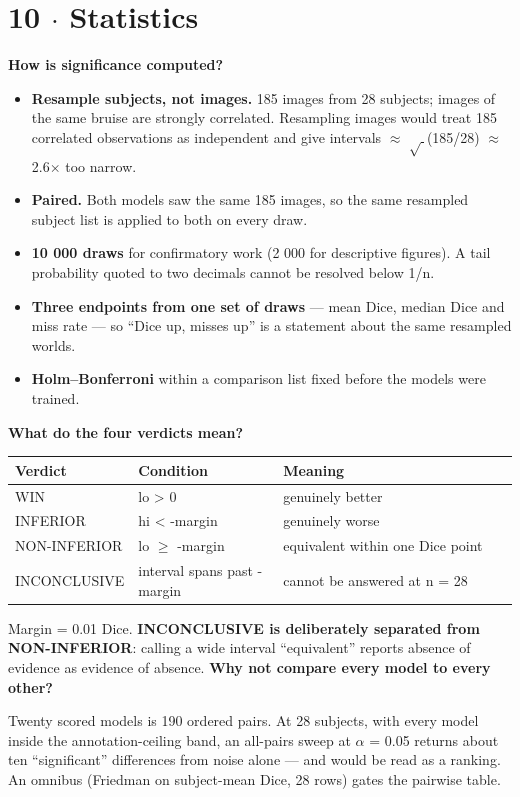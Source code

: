 \documentclass[10pt,a4paper]{article}
\newcommand{\qq}[1]{\medskip\noindent\textbf{\color{navy}#1}\par\nobreak}
\begin{document}
\section*{10 $\cdot$ Statistics}
\qq{How is significance computed?}
\begin{itemize}\setlength\itemsep{1pt}
\item \textbf{Resample subjects, not images.} 185 images from 28 subjects; images of the same bruise are strongly correlated. Resampling images would treat 185 correlated observations as independent and give intervals $\approx$ $\sqrt{\ }$(185/28) $\approx$ 2.6$\times$ too narrow.
\item \textbf{Paired.} Both models saw the same 185 images, so the same resampled subject list is applied to both on every draw.
\item \textbf{10 000 draws} for confirmatory work (2 000 for descriptive figures). A tail probability quoted to two decimals cannot be resolved below 1/n.
\item \textbf{Three endpoints from one set of draws} — mean Dice, median Dice and miss rate — so ``Dice up, misses up'' is a statement about the same resampled worlds.
\item \textbf{Holm–Bonferroni} within a comparison list fixed before the models were trained.
\end{itemize}
\qq{What do the four verdicts mean?}
\begin{center}\small\begin{tabular}{p{0.2\linewidth}p{0.3\linewidth}p{0.5\linewidth}}
\toprule
\textbf{Verdict} & \textbf{Condition} & \textbf{Meaning} \\
\midrule
WIN & lo > 0 & genuinely better \\
INFERIOR & hi < -margin & genuinely worse \\
NON-INFERIOR & lo $\geq$ -margin & equivalent within one Dice point \\
INCONCLUSIVE & interval spans past -margin & cannot be answered at n = 28 \\
\bottomrule\end{tabular}\end{center}
Margin = 0.01 Dice. \textbf{INCONCLUSIVE is deliberately separated from NON-INFERIOR}: calling a wide interval ``equivalent'' reports absence of evidence as evidence of absence.
\qq{Why not compare every model to every other?}
Twenty scored models is 190 ordered pairs. At 28 subjects, with every model inside the annotation-ceiling band, an all-pairs sweep at $\alpha$ = 0.05 returns about ten ``significant'' differences from noise alone — and would be read as a ranking. An omnibus (Friedman on subject-mean Dice, 28 rows) gates the pairwise table.
\end{document}
